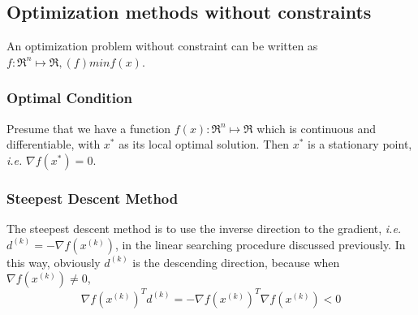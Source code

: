 \subsection{Optimization methods without constraints}

An optimization problem without constraint can be written as
$f: \Re^n \mapsto \Re, (f) min f(x)$.

 \subsubsection{Optimal Condition}

 Presume that we have a function $f(x): \Re^n \mapsto \Re$ which is
 continuous and differentiable, with $x^*$ as its local optimal
 solution. Then $x^*$ is a stationary point, \emph{i.e.}
 $\nabla f(x^*) = 0$.

 \subsubsection{Steepest Descent Method}

 The steepest descent method is to use the inverse direction to the
 gradient, \emph{i.e.} $d^{(k)} = -\nabla f(x^{(k)})$,
 in the linear searching procedure discussed previously. In this
 way, obviously $d^{(k)}$ is the descending direction, because
 when $\nabla f(x^{(k)}) \neq 0$,
 $$ \nabla f(x^{(k)})^T d^{(k)} = -\nabla f(x^{(k)})^T 
    \nabla f(x^{(k)}) < 0$$


